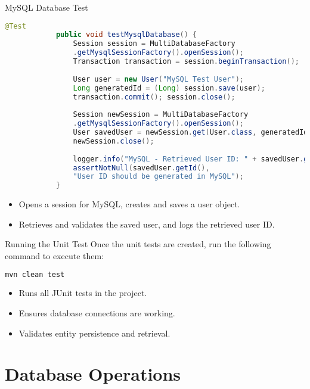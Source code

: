 \documentclass[aspectratio=169, table]{beamer}
\begin{document}
	\begin{frame}[fragile]{MySQL Database Test}
		\vspace{20pt}
		\begin{lstlisting}[language=Java, style=JavaStyle, firstnumber=65]
			@Test
			public void testMysqlDatabase() {
				Session session = MultiDatabaseFactory
				.getMysqlSessionFactory().openSession();
				Transaction transaction = session.beginTransaction();
				
				User user = new User("MySQL Test User");
				Long generatedId = (Long) session.save(user);
				transaction.commit(); session.close();
				
				Session newSession = MultiDatabaseFactory
				.getMysqlSessionFactory().openSession();
				User savedUser = newSession.get(User.class, generatedId);
				newSession.close();
				
				logger.info("MySQL - Retrieved User ID: " + savedUser.getId());
				assertNotNull(savedUser.getId(), 
				"User ID should be generated in MySQL");
			}
		\end{lstlisting}
		
		\begin{itemize}
			\item Opens a session for MySQL, creates and saves a user object.
			\item Retrieves and validates the saved user, and logs the retrieved user ID.
		\end{itemize}
	\end{frame}
	
	\begin{frame}[fragile]{Running the Unit Test}
		Once the unit tests are created, run the following command to execute them:
		
		\begin{lstlisting}[language=bash, style=XmlStyle]
			mvn clean test
		\end{lstlisting}
		
		\begin{itemize}
			\item Runs all JUnit tests in the project.
			\item Ensures database connections are working.
			\item Validates entity persistence and retrieval.
		\end{itemize}
	\end{frame}


\section{Database Operations}
\end{document}
